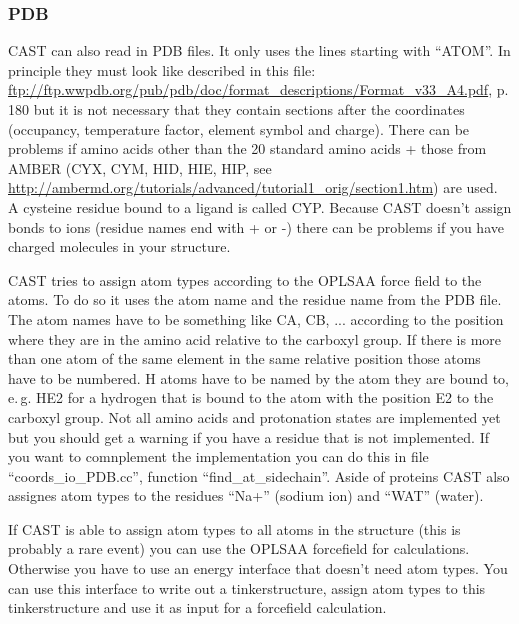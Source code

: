 \documentclass[10pt,a4paper]{article} %
\begin{document}
\subsubsection{PDB}  \label{sec:pdb}

CAST can also read in PDB files. It only uses the lines starting with ``ATOM''. In principle they must look like described in this file: \url{ftp://ftp.wwpdb.org/pub/pdb/doc/format_descriptions/Format_v33_A4.pdf}, p. 180 but it is not necessary that they contain sections after the coordinates (occupancy, temperature factor, element symbol and charge). There can be problems if amino acids other than the 20 standard amino acids + those from AMBER (CYX, CYM, HID, HIE, HIP, see \url{http://ambermd.org/tutorials/advanced/tutorial1_orig/section1.htm}) are used. A cysteine residue bound to a ligand is called CYP. Because CAST doesn't assign bonds to ions (residue names end with + or -) there can be problems if you have charged molecules in your structure. 

CAST tries to assign atom types according to the OPLSAA force field to the atoms. To do so it uses the atom name and the residue name from the PDB file. The atom names have to be something like CA, CB, ... according to the position where they are in the amino acid relative to the carboxyl group. If there is more than one atom of the same element in the same relative position those atoms have to be numbered. H atoms have to be named by the atom they are bound to, e.\,g. HE2 for a hydrogen that is bound to the atom with the position E2 to the carboxyl group. Not all amino acids and protonation states are implemented yet but you should get a warning if you have a residue that is not implemented. If you want to comnplement the implementation you can do this in file ``coords\_io\_PDB.cc'', function ``find\_at\_sidechain''. Aside of proteins CAST also assignes atom types to the residues ``Na+'' (sodium ion) and ``WAT'' (water).

If CAST is able to assign atom types to all atoms in the structure (this is probably a rare event) you can use the OPLSAA forcefield for calculations. Otherwise you have to use an energy interface that doesn't need atom types. You can use this interface to write out a tinkerstructure, assign atom types to this tinkerstructure and use it as input for a forcefield calculation. 


\end{document}
